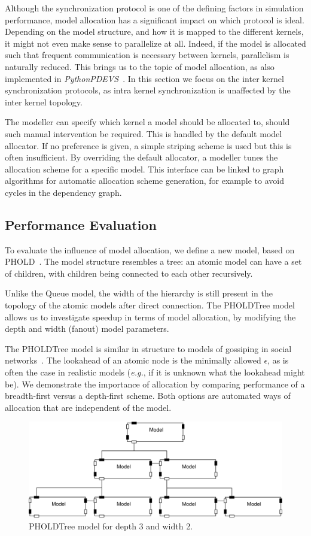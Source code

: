 Although the synchronization protocol is one of the defining factors in simulation performance, model allocation has a significant impact on which protocol is ideal.
Depending on the model structure, and how it is mapped to the different kernels, it might not even make sense to parallelize at all.
Indeed, if the model is allocated such that frequent communication is necessary between kernels, parallelism is naturally reduced.
This brings us to the topic of model allocation, as also implemented in \textit{PythonPDEVS}~\cite{PythonPDEVS2}.
In this section we focus on the inter kernel synchronization protocols, as intra kernel synchronization is unaffected by the inter kernel topology.

The modeller can specify which kernel a model should be allocated to, should such manual intervention be required.
This is handled by the default model allocator.
If no preference is given, a simple striping scheme is used but this is often insufficient.
By overriding the default allocator, a modeller tunes the allocation scheme for a specific model.
This interface can be linked to graph algorithms for automatic allocation scheme generation, for example to avoid cycles in the dependency graph.

\subsection{Performance Evaluation}
To evaluate the influence of model allocation, we define a new model, based on PHOLD~\cite{PHOLD}.
The model structure resembles a tree: an atomic model can have a set of children, with children being connected to each other recursively.

Unlike the Queue model, the width of the hierarchy is still present in the topology of the atomic models after direct connection.
The PHOLDTree model allows us to investigate speedup in terms of model allocation, by modifying the depth and width (fanout) model parameters.

The PHOLDTree model is similar in structure to models of gossiping in social networks~\cite{Gossip}.
The lookahead of an atomic node is the minimally allowed $\epsilon$, as is often the case in realistic models (\textit{e.g.}, if it is unknown what the lookahead might be).
We demonstrate the importance of allocation by comparing performance of a breadth-first versus a depth-first scheme.
Both options are automated ways of allocation that are independent of the model.

\begin{figure}
    \center
    \includegraphics[width=\columnwidth]{fig/pholdtree.pdf}
    \caption{PHOLDTree model for depth 3 and width 2.}
    \label{fig:PHOLDTree_model}
\end{figure}

